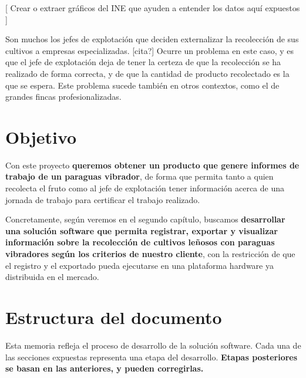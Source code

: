 [ Crear o extraer gráficos del INE que ayuden a entender los datos aquí expuestos ]

Son muchos los jefes de explotación que deciden externalizar la recolección
de sus cultivos a empresas especializadas. [cita?] Ocurre un problema en este
caso, y es que el jefe de explotación deja de tener la certeza de que la
recolección se ha realizado de forma correcta, y de que la cantidad de producto
recolectado es la que se espera. Este problema sucede también en otros
contextos, como el de grandes fincas profesionalizadas.


\section{Objetivo}

Con este proyecto \textbf{queremos obtener un producto que genere informes
de trabajo de un paraguas vibrador}, de forma que permita tanto a
quien recolecta el fruto como al jefe de explotación tener información
acerca de una jornada de trabajo para certificar el trabajo realizado.

Concretamente, según veremos en el segundo capítulo, buscamos \textbf{desarrollar
una solución software que permita registrar, exportar y visualizar
información sobre la recolección de cultivos
leñosos con paraguas vibradores según los criterios de nuestro cliente},
con la restricción de que el registro y el exportado pueda ejecutarse en
una plataforma hardware ya distribuida en el mercado.

\section{Estructura del documento}

Esta memoria refleja el proceso de desarrollo de la solución software.
Cada una de las secciones expuestas representa una etapa del desarrollo.
\textbf{Etapas posteriores se basan en las anteriores, y pueden corregirlas.}

